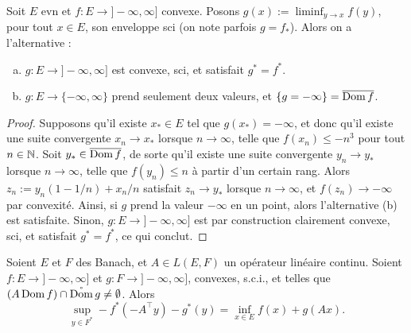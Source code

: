 \begin{lemma}
\label{lem:cvxSciAlt}
%
	Soit $E$ evn et $f : E \to ]-\infty,\infty]$ convexe. Posons $g(x) := \liminf_{y \to x} f(y)$, pour tout $x \in E$, son enveloppe sci (on note parfois $g = f_*$). Alors on a l'alternative : 
	\begin{enumerate}[(a)]
		\item $g: E \to ]-\infty,\infty]$ est convexe, sci, et satisfait $g^* = f^*$.
		\item $g : E \to \{-\infty,\infty\}$ prend seulement deux valeurs, et $\{g = -\infty\} = \overline{\operatorname{Dom} f}$. %
	\end{enumerate}
\end{lemma}

\begin{proof}
	Supposons qu'il existe $x_* \in E$ tel que $g(x_*) = -\infty$, et donc qu'il existe une suite convergente $x_n \to x_*$ lorsque $n \to \infty$, telle que $f(x_n) \leq -n^3$ pour tout $n \in \mathbb{N}$.
	Soit $y_* \in \overline{\operatorname{Dom} f}$, de sorte qu'il existe une suite convergente $y_n \to y_*$ lorsque $n \to \infty$, telle que $f(y_n) \leq  n$ à partir d'un certain rang. 
	Alors $z_n := y_n (1-1/ n) + x_n /n$ satisfait $z_n \to y_*$ lorsque $n \to \infty$, et $f(z_n) \to -\infty$ par convexité. 
	Ainsi, si $g$ prend la valeur $-\infty$ en un point, alors l'alternative (b) est satisfaite. 
	Sinon, $g : E \to ]-\infty,\infty]$ est par construction clairement convexe, sci, et satisfait $g^*=f^*$, ce qui conclut. 
\end{proof}

\begin{theorem}
\label{th:FenchelRockafellar}
%
Soient $E$ et $F$ des Banach, et $A \in L(E,F)$ un opérateur linéaire continu. Soient $f: E \to ]-\infty,\infty]$ et $g : F \to ]-\infty,\infty]$, convexes, s.c.i., et telles que $(A \operatorname{Dom} f) \cap \mathring{\operatorname{Dom}}\, g \neq \emptyset$. 
Alors 
\begin{equation*}
	\sup_{y \in F^*} -f^*(-A^\top y) - g^*(y) = \inf_{x \in E} f(x) + g(A x).
\end{equation*}
\end{theorem}

